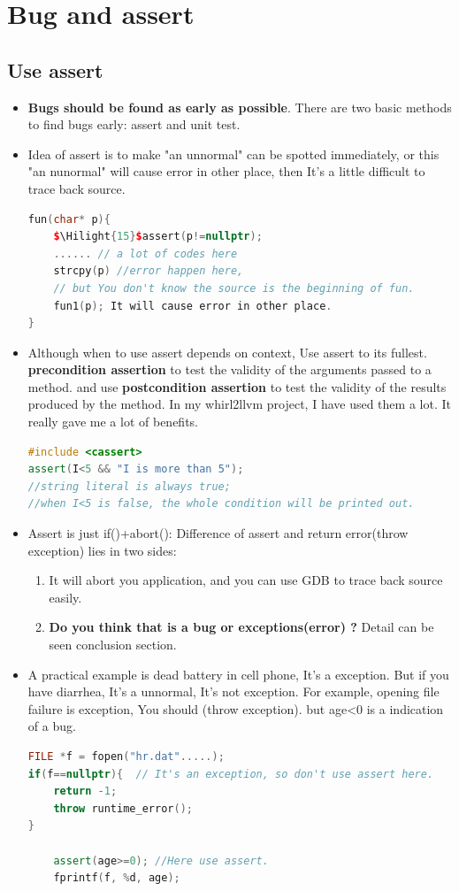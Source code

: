 \documentclass[a4paper,11pt,twoside]{book}
\newcommand{\Hilight}[1]{\makebox[0pt][l]{\color{yellow}\rule[-3pt]{#1em}{11pt}}}
\newcommand{\Hilight}[1]{}
\begin{document}
\section{Bug and assert}
\subsection{Use assert}
\begin{itemize}
	\item \textbf{Bugs should be found as early as possible}. There are two basic methods to find bugs early: assert and unit test.
	
	\item Idea of assert is to make "an unnormal" can be spotted immediately, or this "an nunormal" will cause error in other place, then It's a little difficult to trace back source.
\begin{lstlisting}[frame=single, language=c++]
fun(char* p){
	$\Hilight{15}$assert(p!=nullptr);
	...... // a lot of codes here
	strcpy(p) //error happen here,
	// but You don't know the source is the beginning of fun.	
	fun1(p); It will cause error in other place.
}
\end{lstlisting}
	
	\item Although when to use assert depends on context, Use assert to its fullest. \textbf{precondition assertion} to test the validity of the arguments passed to a method. and use \textbf{postcondition assertion} to test the validity of the results produced by the method.  In my whirl2llvm project, I have used them a lot. It really gave me a lot of benefits.
\begin{lstlisting}[frame=single, language=c++]
#include <cassert>
assert(I<5 && "I is more than 5");
//string literal is always true;
//when I<5 is false, the whole condition will be printed out.
\end{lstlisting}
	
	
	\item Assert is just if()+abort(): Difference of assert and return error(throw exception)  lies in two sides: 
	\begin{enumerate}
		\item It will abort you application, and you can use GDB to trace back source easily.
		\item \textbf{Do you think that is a bug or  exceptions(error) ?} Detail can be seen conclusion section.
	\end{enumerate}
	
	\item A practical example is dead battery in cell phone, It's a exception. But if you have diarrhea, It's a unnormal, It's not exception. For example, opening file failure is exception, You should (throw exception). but age<0 is a indication of a bug.
\begin{lstlisting}[frame=single, language=c++]
	FILE *f = fopen("hr.dat".....);
if(f==nullptr){  // It's an exception, so don't use assert here.
	return -1;
	throw runtime_error();
}
	
	assert(age>=0); //Here use assert.
	fprintf(f, %d, age);
\end{lstlisting}
	
\end{itemize}
\end{document}
